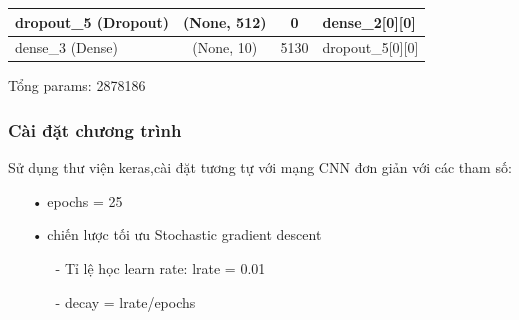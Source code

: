 \documentclass[a4paper,12pt]{report}
\begin{document}
{\begin{center}
\begin{longtable}{lccl}
\hline
dropout\_5 (Dropout)    &          (None, 512) &          0      &     dense\_2[0][0]        \\           

\hline
dense\_3 (Dense)         &         (None, 10) &           5130    &    dropout\_5[0][0]          \\        

\hline
\end{longtable} 
\end{center}
}
Tổng params: 2878186
\subsubsection{Cài đặt chương trình}
Sử dụng thư viện keras,cài đặt tương tự với mạng CNN đơn giản với các tham số:
\begin{itemize}
\item[•] epochs = 25
\item[•] chiến lược tối ưu Stochastic gradient descent
\begin{itemize}
\item[-] Tỉ lệ học learn rate: lrate = 0.01
\item[-] decay = lrate/epochs
\end{itemize}
\end{itemize}
\end{document}

